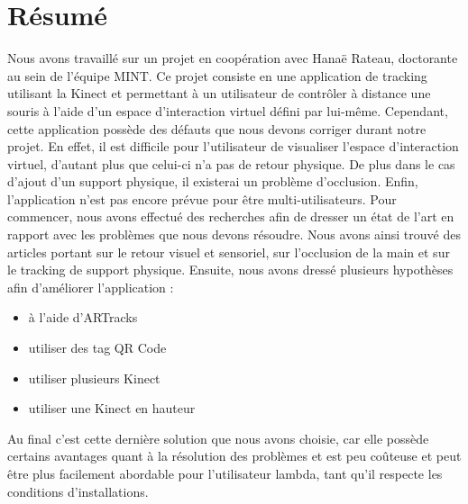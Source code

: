 \chapter*{Résumé}

Nous avons travaillé sur un projet en coopération avec Hanaë Rateau, doctorante au sein de l’équipe MINT. Ce projet consiste en une application de tracking utilisant la Kinect et permettant à un utilisateur de contrôler à distance une souris à l’aide d’un espace d'interaction virtuel défini par lui-même. 
Cependant, cette application possède des défauts que nous devons corriger durant notre projet. En effet, il est difficile pour l’utilisateur de visualiser l’espace d’interaction virtuel, d’autant plus que celui-ci n’a pas de retour physique. De plus dans le cas d’ajout d’un support physique, il existerai un problème d’occlusion. Enfin, l’application n’est pas encore prévue pour être multi-utilisateurs.  
Pour commencer, nous avons effectué des recherches afin de dresser un état de l’art en rapport avec les problèmes que nous devons résoudre. Nous avons ainsi trouvé des articles portant sur le retour visuel et sensoriel, sur l’occlusion de la main et sur le tracking de support physique. Ensuite, nous avons dressé plusieurs hypothèses afin d’améliorer l’application :

\begin{itemize}
	\item à l’aide d’ARTracks
	\item utiliser des tag QR Code
	\item utiliser plusieurs Kinect
	\item utiliser une Kinect en hauteur
\end{itemize}

Au final c’est cette dernière solution que nous avons choisie, car elle possède certains avantages quant à la résolution des problèmes et est peu coûteuse et peut être plus facilement abordable pour l’utilisateur lambda, tant qu’il respecte les conditions d’installations.




